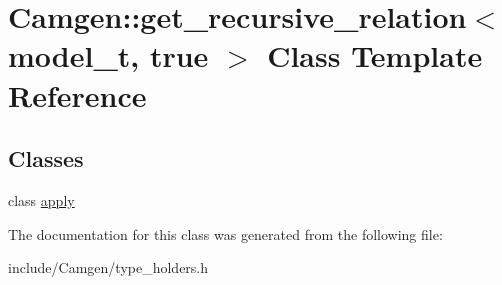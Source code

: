 \hypertarget{a00252}{}\section{Camgen\+:\+:get\+\_\+recursive\+\_\+relation$<$ model\+\_\+t, true $>$ Class Template Reference}
\label{a00252}
\subsection*{Classes}
\begin{DoxyCompactItemize}
\item 
class \hyperlink{a00013}{apply}
\end{DoxyCompactItemize}


The documentation for this class was generated from the following file\+:\begin{DoxyCompactItemize}
\item 
include/\+Camgen/type\+\_\+holders.\+h\end{DoxyCompactItemize}
